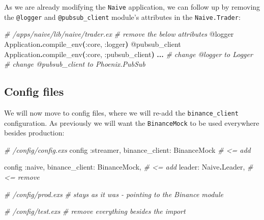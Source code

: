 \documentclass[
  oneside]{book}
\newenvironment{Shaded}{\begin{snugshade}}{\end{snugshade}}
\newcommand{\CommentTok}[1]{\textcolor[rgb]{0.56,0.35,0.01}{\textit{#1}}}
\newcommand{\ConstantTok}[1]{\textcolor[rgb]{0.56,0.35,0.01}{#1}}
\newcommand{\FunctionTok}[1]{\textcolor[rgb]{0.13,0.29,0.53}{\textbf{#1}}}
\newcommand{\NormalTok}[1]{#1}
\newcommand{\OperatorTok}[1]{\textcolor[rgb]{0.81,0.36,0.00}{\textbf{#1}}}
\newcommand{\OtherTok}[1]{\textcolor[rgb]{0.56,0.35,0.01}{#1}}
\newcommand{\VariableTok}[1]{\textcolor[rgb]{0.00,0.00,0.00}{#1}}
\begin{document}
\newpage

As we are already modifying the \texttt{Naive} application, we can follow up by removing the \texttt{@logger} and \texttt{@pubsub\_client} module's attributes in the \texttt{Naive.Trader}:

\begin{Shaded}
\begin{Highlighting}[]
\CommentTok{\# /apps/naive/lib/naive/trader.ex}
  \CommentTok{\# remove the below attributes}
  \OtherTok{@logger} \ConstantTok{Application}\OperatorTok{.}\NormalTok{compile\_env}\FunctionTok{(}\VariableTok{:core}\NormalTok{, }\VariableTok{:logger}\FunctionTok{)}
  \OtherTok{@pubsub\_client} \ConstantTok{Application}\OperatorTok{.}\NormalTok{compile\_env}\FunctionTok{(}\VariableTok{:core}\NormalTok{, }\VariableTok{:pubsub\_client}\FunctionTok{)}
  \OperatorTok{...}
  \CommentTok{\# change @logger to Logger}
  \CommentTok{\# change @pubsub\_client to Phoenix.PubSub}
\end{Highlighting}
\end{Shaded}

\subsection{Config files}\label{config-files}

We will now move to config files, where we will re-add the \texttt{binance\_client} configuration. As previously we will want the \texttt{BinanceMock} to be used everywhere besides production:

\begin{Shaded}
\begin{Highlighting}[]
\CommentTok{\# /config/config.exs}
\NormalTok{config }\VariableTok{:streamer}\NormalTok{,}
  \VariableTok{binance\_client:} \ConstantTok{BinanceMock} \CommentTok{\# \textless{}= add}

\NormalTok{config }\VariableTok{:naive}\NormalTok{,}
  \VariableTok{binance\_client:} \ConstantTok{BinanceMock}\NormalTok{,  }\CommentTok{\# \textless{}= add}
  \VariableTok{leader:} \ConstantTok{Naive}\OperatorTok{.}\ConstantTok{Leader}\NormalTok{,         }\CommentTok{\# \textless{}= remove}

\CommentTok{\# /config/prod.exs}
\CommentTok{\# stays as it was {-} pointing to the \textasciigrave{}Binance\textasciigrave{} module}

\CommentTok{\# /config/test.exs}
\CommentTok{\# remove everything besides the \textasciigrave{}import\textasciigrave{}}
\end{Highlighting}
\end{Shaded}
\end{document}

